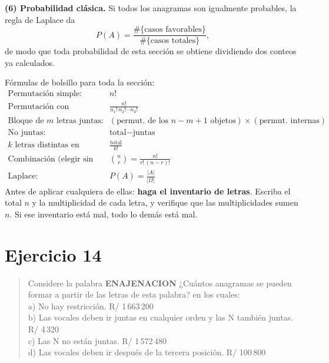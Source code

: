 \documentclass[11pt]{article}
\begin{document}
\begin{teo}
\medskip
\textbf{(6) Probabilidad clásica.} Si todos los anagramas son igualmente probables, la regla de Laplace da
\[
P(A)=\frac{\#\{\text{casos favorables}\}}{\#\{\text{casos totales}\}},
\]
de modo que toda probabilidad de esta sección se obtiene dividiendo dos conteos ya calculados.
\end{teo}

\begin{tip}
Fórmulas de bolsillo para toda la sección:
\[
\begin{aligned}
\text{Permutación simple:}&\quad n!\\
\text{Permutación con repetición:}&\quad \frac{n!}{n_1!\,n_2!\cdots n_k!}\\
\text{Bloque de $m$ letras juntas:}&\quad (\text{permut. de los } n-m+1 \text{ objetos})\times(\text{permut. internas})\\
\text{No juntas:}&\quad \text{total}-\text{juntas}\\
\text{$k$ letras distintas en orden fijo:}&\quad \frac{\text{total}}{k!}\\
\text{Combinación (elegir sin orden):}&\quad \binom{n}{r}=\frac{n!}{r!\,(n-r)!}\\
\text{Laplace:}&\quad P(A)=\frac{|A|}{|\Omega|}
\end{aligned}
\]
Antes de aplicar cualquiera de ellas: \textbf{haga el inventario de letras}. Escriba el total $n$ y la
multiplicidad de cada letra, y verifique que las multiplicidades sumen $n$. Si ese inventario está mal,
todo lo demás está mal.
\end{tip}

\section*{Ejercicio 14}

\begin{quote}
Considere la palabra \textbf{ENAJENACION} ¿Cuántos anagramas se pueden formar a partir de las letras de
esta palabra? en los cuales:\\
a) No hay restricción. \hfill R/ 1\,663\,200\\
b) Las vocales deben ir juntas en cualquier orden y las N también juntas. \hfill R/ 4\,320\\
c) Las N no están juntas. \hfill R/ 1\,572\,480\\
d) Las vocales deben ir después de la tercera posición. \hfill R/ 100\,800
\end{quote}
\end{document}
